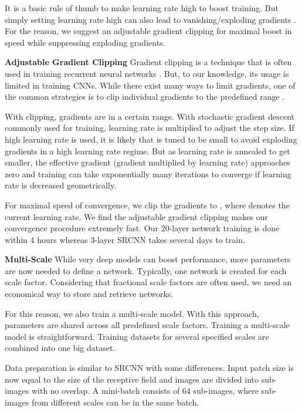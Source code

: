 \documentclass[10pt,twocolumn,letterpaper]{article}
\begin{document}
It is a basic rule of thumb to make learning rate high to boost training. But simply setting learning rate high can also lead to vanishing/exploding gradients \cite{bengio1994learning}. For the reason, we suggest an adjustable gradient clipping for maximal boost in speed while suppressing exploding gradients.

\textbf{Adjustable Gradient Clipping}
Gradient clipping is a technique that is often used in training recurrent neural networks \cite{pascanu2013difficulty}. But, to our knowledge, its usage is limited in training CNNs. While there exist many ways to limit gradients, one of the common strategies is to clip individual gradients to the predefined range 
. 

With clipping, gradients are in a certain range. With stochastic gradient descent commonly used for training, learning rate is multiplied to adjust the step size. If high learning rate is used, it is likely that  is tuned to be small to avoid exploding gradients in a high learning rate regime. But as learning rate is annealed to get smaller, the effective gradient (gradient multiplied by learning rate) approaches zero and training can take exponentially many iterations to converge if learning rate is decreased geometrically.

For maximal speed of convergence, we clip the gradients to , where  denotes the current learning rate. We find the adjustable gradient clipping makes our convergence procedure extremely fast. Our 20-layer network training is done within 4 hours whereas 3-layer SRCNN takes several days to train. 


\textbf{Multi-Scale} While very deep models can boost performance, more parameters are now needed to define a network. Typically, one network is created for each scale factor. Considering that fractional scale factors are often used, we need an economical way to store and retrieve networks.

For this reason, we also train a multi-scale model. With this approach, parameters are shared across all predefined scale factors. Training a multi-scale model is straightforward. Training datasets for several specified scales are combined into one big dataset.

Data preparation is similar to SRCNN \cite{Dong2014} with some differences. Input patch size is now equal to the size of the receptive field and images are divided into sub-images with no overlap. A mini-batch consists of 64 sub-images, where sub-images from different scales can be in the same batch.
\end{document}
